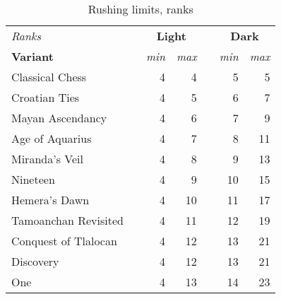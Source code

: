 \begin{table}[!h]
\centering
\begin{tabular}{ lcrrcrr }
\toprule %
\emph{Ranks}          & & \multicolumn{2}{c}{ \textbf{Light} } & & \multicolumn{2}{c}{ \textbf{Dark} }    \\
\cmidrule{1-1}          \cmidrule{3-4}                           \cmidrule{6-7} %
\textbf{Variant}      & & \emph{min} & \emph{max}              & & \emph{min} & \emph{max}                \\
\midrule %
Classical Chess       & & 4          & 4                       & & 5          &  5                        \\
Croatian Ties         & & 4          & 5                       & & 6          &  7                        \\
Mayan Ascendancy      & & 4          & 6                       & & 7          &  9                        \\
Age of Aquarius       & & 4          & 7                       & & 8          & 11                        \\
Miranda's Veil        & & 4          & 8                       & & 9          & 13                        \\
Nineteen              & & 4          & 9                       & & 10         & 15                        \\
Hemera's Dawn         & & 4          & 10                      & & 11         & 17                        \\
Tamoanchan Revisited  & & 4          & 11                      & & 12         & 19                        \\
Conquest of Tlalocan  & & 4          & 12                      & & 13         & 21                        \\
Discovery             & & 4          & 12                      & & 13         & 21                        \\
One                   & & 4          & 13                      & & 14         & 23                        \\
\bottomrule %
\end{tabular}
\caption{Rushing limits, ranks}
\label{tbl:Appendix/Summary/Rushing limits}
\end{table}

